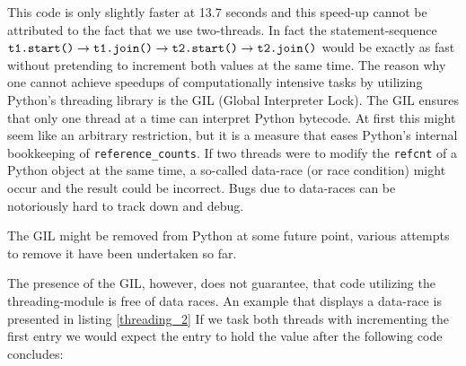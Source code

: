 \documentclass[english,11pt,a4paper,table]{article} %
\begin{document}

This code is only slightly faster at 13.7 seconds and this speed-up cannot be attributed to the fact that we use two-threads.
In fact the statement-sequence $\texttt{t1.start()} \rightarrow \texttt{t1.join()} \rightarrow \texttt{t2.start()} \rightarrow \texttt{\texttt{t2.join()}}$ would be exactly as fast without pretending to increment both values at the same time.
The reason why one cannot achieve speedups of computationally intensive tasks by utilizing Python's threading library is the GIL (Global Interpreter Lock).
The GIL ensures that only one thread at a time can interpret Python bytecode. At first this might seem like an arbitrary restriction, but it is a measure that eases Python's internal bookkeeping of \texttt{reference\_counts}.
If two threads were to modify the \texttt{refcnt} of a Python object at the same time, a so-called data-race (or race condition) might occur and the result could be incorrect.
Bugs due to data-races can be notoriously hard to track down and debug. \cite{Valgrind}

The GIL might be removed from Python at some future point, various attempts to remove it have been undertaken so far. \cite{Gilectomy, GIL2}

The presence of the GIL, however, does not guarantee, that code utilizing the threading-module is free of data races. An example that displays a data-race is presented in listing \ref{threading_2} If we task both threads with incrementing the first entry we would expect the entry to hold the value  after the following code concludes:
\end{document}
